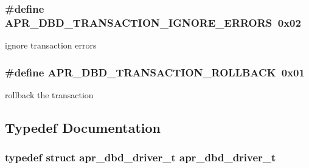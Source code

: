 \subsubsection[{\texorpdfstring{A\+P\+R\+\_\+\+D\+B\+D\+\_\+\+T\+R\+A\+N\+S\+A\+C\+T\+I\+O\+N\+\_\+\+I\+G\+N\+O\+R\+E\+\_\+\+E\+R\+R\+O\+RS}{APR_DBD_TRANSACTION_IGNORE_ERRORS}}]{\setlength{\rightskip}{0pt plus 5cm}\#define A\+P\+R\+\_\+\+D\+B\+D\+\_\+\+T\+R\+A\+N\+S\+A\+C\+T\+I\+O\+N\+\_\+\+I\+G\+N\+O\+R\+E\+\_\+\+E\+R\+R\+O\+RS~0x02}\hypertarget{group__APR__Util__DBD_gad9dc523b0a3b8dea5b8c9b7b0c281ea2}{}\label{group__APR__Util__DBD_gad9dc523b0a3b8dea5b8c9b7b0c281ea2}
ignore transaction errors 
\subsubsection[{\texorpdfstring{A\+P\+R\+\_\+\+D\+B\+D\+\_\+\+T\+R\+A\+N\+S\+A\+C\+T\+I\+O\+N\+\_\+\+R\+O\+L\+L\+B\+A\+CK}{APR_DBD_TRANSACTION_ROLLBACK}}]{\setlength{\rightskip}{0pt plus 5cm}\#define A\+P\+R\+\_\+\+D\+B\+D\+\_\+\+T\+R\+A\+N\+S\+A\+C\+T\+I\+O\+N\+\_\+\+R\+O\+L\+L\+B\+A\+CK~0x01}\hypertarget{group__APR__Util__DBD_ga60a8749e5172b692fd2e356b48ec922b}{}\label{group__APR__Util__DBD_ga60a8749e5172b692fd2e356b48ec922b}
rollback the transaction 

\subsection{Typedef Documentation}
\subsubsection[{\texorpdfstring{apr\+\_\+dbd\+\_\+driver\+\_\+t}{apr_dbd_driver_t}}]{\setlength{\rightskip}{0pt plus 5cm}typedef struct {\bf apr\+\_\+dbd\+\_\+driver\+\_\+t} {\bf apr\+\_\+dbd\+\_\+driver\+\_\+t}}\hypertarget{group__APR__Util__DBD_ga91778287e3cd1b8ef8719ca2655e2bc8}{}\label{group__APR__Util__DBD_ga91778287e3cd1b8ef8719ca2655e2bc8}
